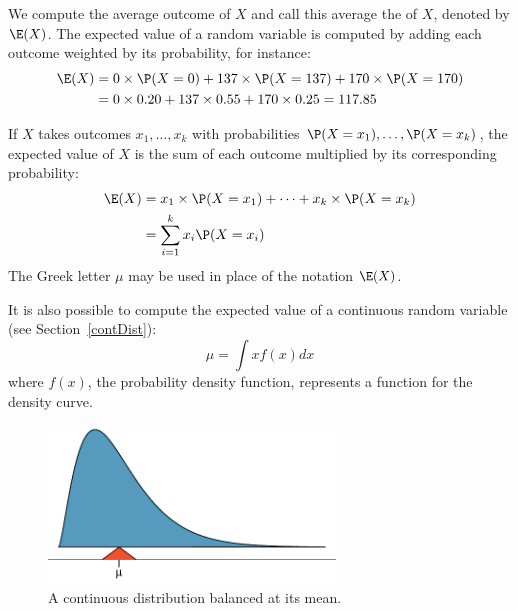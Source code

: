 We compute the average outcome of $X$ and call this average the  of $X$, denoted by $\E(X)$. The expected value of a random variable is computed by adding each outcome weighted by its probability, for instance:
\begin{align*}
\E(X) &= 0 \times  \P(X=0) + 137 \times  \P(X=137) + 170 \times  \P(X=170) \\
	&= 0 \times  0.20 + 137 \times  0.55 + 170 \times  0.25 = 117.85
\end{align*}

\begin{termBox}{
If $X$ takes outcomes $x_1,\dots, x_k$ with probabilities $\P(X=x_1),\dots, \P(X=x_k)$, the expected value of $X$ is the sum of each outcome multiplied by its corresponding probability:
\begin{align}
\E(X) 	&= x_1\times \P(X=x_1) + \cdots + x_k\times \P(X=x_k) \notag \\
	&= \sum_{i=1}^{k}x_i\P(X=x_i)
\end{align}
The Greek letter $\mu$ may be used in place of the notation $\E(X)$.}
\end{termBox}

It is also possible to compute the expected value of a continuous random variable (see Section~\ref{contDist}):
\[
\mu = \int xf(x)dx
\]
where $f(x)$, the probability density function, represents a function for the density curve.


\begin{figure}
\centering
\includegraphics[width=0.68\textwidth]{ch_probability/figures/contBalance/contBalance}
\caption{A continuous distribution balanced at its mean.}
\label{contBalance}
\end{figure}

